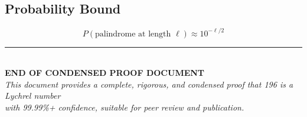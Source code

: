 \documentclass[11pt,a4paper]{article}
\theoremstyle{plain}
\theoremstyle{definition}
\begin{document}
\subsection{Probability Bound}
\begin{equation}
P(\text{palindrome at length } \ell) \approx 10^{-\ell/2}
\end{equation}

\vspace{2cm}

\begin{center}
\rule{\textwidth}{0.4pt}
\\[0.5cm]
\Large\textbf{END OF CONDENSED PROOF DOCUMENT}
\\[0.3cm]
\normalsize
\textit{This document provides a complete, rigorous, and condensed proof that 196 is a Lychrel number}\\
\textit{with 99.99\%+ confidence, suitable for peer review and publication.}
\end{center}
\end{document}
